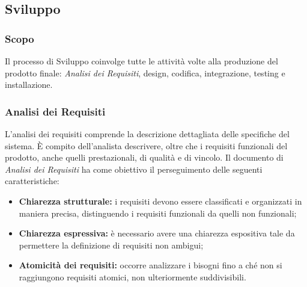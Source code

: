 \subsection{Sviluppo}
\subsubsection{Scopo}
Il processo di Sviluppo coinvolge tutte le attività volte alla produzione del prodotto finale: \textit{Analisi dei Requisiti\doc},  design, codifica, integrazione, testing e installazione.
\subsubsection{Analisi dei Requisiti}
L'analisi dei requisiti comprende la descrizione dettagliata delle specifiche del sistema. È compito dell'analista descrivere, oltre che i requisiti funzionali del prodotto, anche quelli prestazionali, di qualità e di vincolo. 
Il documento di \textit{Analisi dei Requisiti\doc} ha come obiettivo il perseguimento delle seguenti caratteristiche:
\begin{itemize}
	\item \textbf{Chiarezza strutturale:} i requisiti devono essere classificati e organizzati in maniera precisa, distinguendo i requisiti funzionali da quelli non funzionali;
	\item \textbf{Chiarezza espressiva:} è necessario avere una chiarezza espositiva tale da permettere la definizione di requisiti non ambigui;
	\item \textbf{Atomicità dei requisiti:} occorre analizzare i bisogni fino a ché non si raggiungono requisiti atomici, non ulteriormente suddivisibili.  
\end{itemize}

